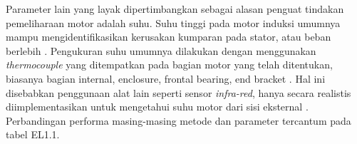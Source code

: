 \documentclass{elsinta}
\begin{document}
Parameter lain yang layak dipertimbangkan sebagai alasan penguat tindakan pemeliharaan motor adalah suhu. Suhu tinggi pada motor induksi umumnya mampu mengidentifikasikan kerusakan kumparan pada stator, atau beban berlebih \cite{1.1.12}. Pengukuran suhu umumnya dilakukan dengan menggunakan \textit{thermocouple} yang ditempatkan pada bagian motor yang telah ditentukan, biasanya bagian internal, enclosure, frontal bearing, end bracket \cite{1.1.12}. Hal ini disebabkan penggunaan alat lain seperti sensor \textit{infra-red}, hanya secara realistis diimplementasikan untuk mengetahui suhu motor dari sisi eksternal \cite{1.2.2}. Perbandingan performa masing-masing metode dan parameter tercantum pada tabel EL1.1.


\end{document}
